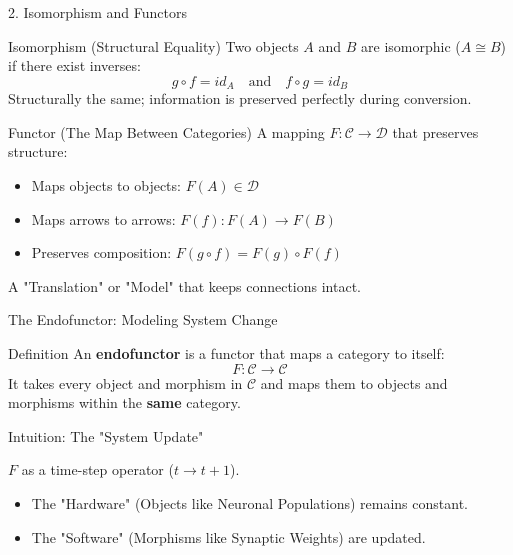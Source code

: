 \documentclass[10pt]{beamer}
\begin{document}
\begin{frame}{2. Isomorphism and Functors}
	\begin{block}{Isomorphism (Structural Equality)}
		Two objects $A$ and $B$ are isomorphic ($A \cong B$) if there exist inverses:
		\[ g \circ f = id_A \quad \text{and} \quad f \circ g = id_B \]
		Structurally the same; information is preserved perfectly during conversion.
	\end{block}
	
	\vspace{0.5cm}
	
	\begin{block}{Functor (The Map Between Categories)}
		A mapping $F: \mathcal{C} \to \mathcal{D}$ that preserves structure:
		\begin{itemize}
			\item Maps objects to objects: $F(A) \in \mathcal{D}$
			\item Maps arrows to arrows: $F(f): F(A) \to F(B)$
			\item Preserves composition: $F(g \circ f) = F(g) \circ F(f)$
		\end{itemize}
		A "Translation" or "Model" that keeps connections intact.
	\end{block}
\end{frame}

\begin{frame}{The Endofunctor: Modeling System Change}

	\begin{block}{Definition}
		An \textbf{endofunctor} is a functor that maps a category to itself:
		\[ F: \mathcal{C} \longrightarrow \mathcal{C} \]
		It takes every object and morphism in $\mathcal{C}$ and maps them to objects and morphisms within the \textbf{same} category.
	\end{block}
	
	\vspace{0.3cm}
	
	\begin{block}{Intuition: The "System Update"}
		
		$F$ as a time-step operator ($t \to t+1$).
		\begin{itemize}
			\item The "Hardware" (Objects like Neuronal Populations) remains constant.
			\item The "Software" (Morphisms like Synaptic Weights) are updated.
		\end{itemize}
	\end{block}
\end{frame}
\end{document}
